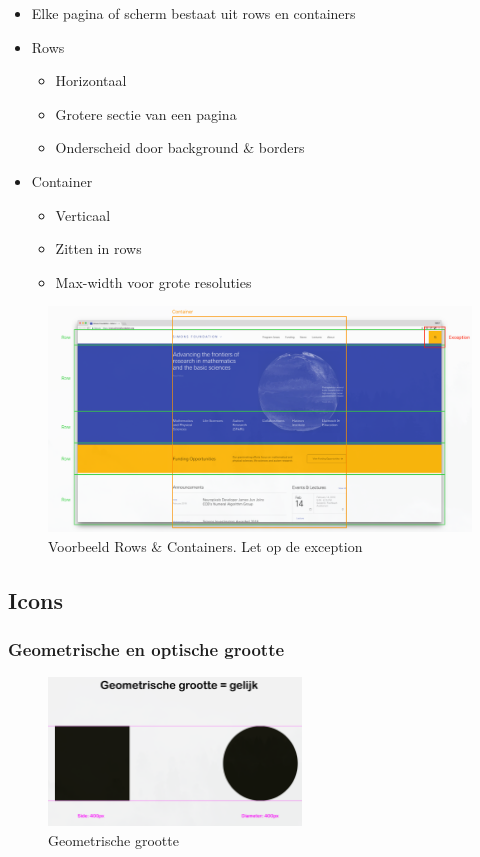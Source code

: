 \documentclass{article}
\begin{document}
\begin{itemize}
    \item Elke pagina of scherm bestaat uit rows en containers 
    \item Rows
    \begin{itemize}
        \item Horizontaal
        \item Grotere sectie van een pagina
        \item Onderscheid door background \& borders
    \end{itemize}
    \item Container
    \begin{itemize}
        \item Verticaal
        \item Zitten in rows
        \item Max-width voor grote resoluties
    \end{itemize}
\end{itemize}

\begin{figure}[H]
    \centering
    \includegraphics[width=\textwidth]{img/Screenshot_20200302_085715.png}
    \caption{Voorbeeld Rows \& Containers. Let op de exception}
\end{figure}

\subsection{Icons}
\subsubsection{Geometrische en optische grootte}
\begin{figure}[H]
    \centering
    \includegraphics[width=0.6\textwidth]{img/Screenshot_20200302_090410.png}
    \caption{Geometrische grootte}
\end{figure}
\end{document}
